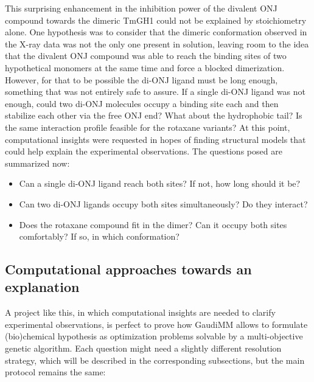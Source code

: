 This surprising enhancement in the inhibition power of the divalent ONJ compound towards the dimeric TmGH1 could not be explained by stoichiometry alone. One hypothesis was to consider that the dimeric conformation observed in the X-ray data was not the only one present in solution, leaving room to the idea that the divalent ONJ compound was able to reach the binding sites of two hypothetical monomers at the same time and force a blocked dimerization. However, for that to be possible the di-ONJ ligand must be long enough, something that was not entirely safe to assure. If a single di-ONJ ligand was not enough, could two di-ONJ molecules occupy a binding site each and then stabilize each other via the free ONJ end? What about the hydrophobic tail? Is the same interaction profile feasible for the rotaxane variants? At this point, computational insights were requested in hopes of finding structural models that could help explain the experimental observations. The questions posed are summarized now:

\begin{itemize}
	\item Can a single di-ONJ ligand reach both sites? If not, how long should it be?
	\item Can two di-ONJ ligands occupy both sites simultaneously? Do they interact?
	\item Does the rotaxane compound fit in the dimer? Can it occupy both sites comfortably? If so, in which conformation?
\end{itemize}

\subsection{Computational approaches towards an explanation}
A project like this, in which computational insights are needed to clarify experimental observations, is perfect to prove how GaudiMM allows to formulate (bio)chemical hypothesis as optimization problems solvable by a multi-objective genetic algorithm. Each question might need a slightly different resolution strategy, which will be described in the corresponding subsections, but the main protocol remains the same:


